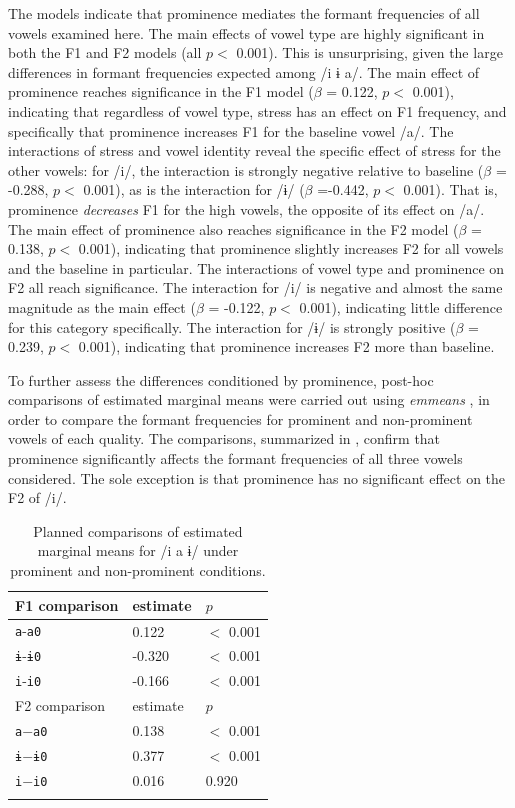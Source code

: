 \documentclass[output=paper,colorlinks,citecolor=brown
]{langscibook}
\begin{document}
The models indicate that prominence mediates the formant frequencies of all vowels examined here. The main effects of vowel type are highly significant in both the F1 and F2 models (all $p<$ 0.001). This is unsurprising, given the large differences in formant frequencies expected among /i ɨ a/. The main effect of prominence reaches significance in the F1 model ($\beta$ = 0.122, $p<$ 0.001), indicating that regardless of vowel type, stress has an effect on F1 frequency, and specifically that prominence increases F1 for the baseline vowel /a/. The interactions of stress and vowel identity reveal the specific effect of stress for the other vowels: for /i/, the interaction is strongly negative relative to baseline ($\beta$ = -0.288, $p<$ 0.001), as is the interaction for /ɨ/ ($\beta$ =-0.442, $p<$ 0.001). That is, prominence \textit{decreases} F1 for the high vowels, the opposite of its effect on /a/. The main effect of prominence also reaches significance in the F2 model ($\beta$ = 0.138, $p<$ 0.001), indicating that prominence slightly increases F2 for all vowels and the baseline in particular. The interactions of vowel type and prominence on F2 all reach significance. The interaction for /i/ is negative and almost the same magnitude as the main effect ($\beta$ = -0.122, $p<$ 0.001), indicating little difference for this category specifically. The interaction for /ɨ/ is strongly positive ($\beta$ = 0.239, $p<$ 0.001), indicating that prominence increases F2 more than baseline.

To further assess the differences conditioned by prominence, post-hoc comparisons of estimated marginal means were carried out using \textit{emmeans} \citep{emmeans}, in order to compare the formant frequencies for prominent and non-prominent vowels of each quality. 
The comparisons, summarized in , confirm that prominence significantly affects the formant frequencies of all three vowels considered. The sole exception is that prominence has no significant effect on the F2 of /i/. 

\begin{table}
    \begin{tabular}{l l l}
    \lsptoprule
    F1 comparison & estimate & $p$\\
    \midrule
        \texttt{a}-\texttt{a0} & 0.122 & $<$ 0.001 \\
        \texttt{ɨ}-\texttt{ɨ0} & -0.320  & $<$ 0.001 \\
        \texttt{i}-\texttt{i0} & -0.166 & $<$ 0.001 \\
    \midrule
        F2 comparison & estimate & $p$\\
    \midrule
        \texttt{a}$-$\texttt{a0} & 0.138 & $<$ 0.001 \\
        \texttt{ɨ}$-$\texttt{ɨ0} & 0.377 & $<$ 0.001 \\
        \texttt{i}$-$\texttt{i0} & 0.016 & 0.920 \\
    \lspbottomrule
    \end{tabular}
    \caption{Planned comparisons of estimated marginal means for /i a ɨ/ under prominent and non-prominent conditions.}
    \label{tab:posthoc}
\end{table}
\end{document}

